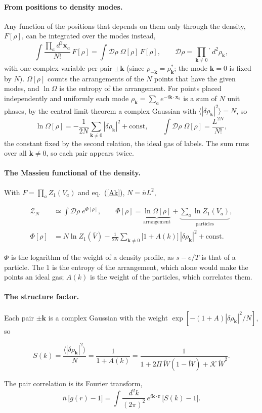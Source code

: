 \documentclass[11pt,aps,preprint,nofootinbib,superscriptaddress,tightenlines]{revtex4-2}
\newcommand{\avg}[1]{\langle #1\rangle}
\def\st{\begin{equation}}
\def\stp{\end{equation}}
\def\Eq#1{eq.~(\ref{#1})}
\let\oldparagraph\paragraph
\renewcommand{\paragraph}{\par\bigskip\oldparagraph}
\begin{document}
\paragraph{From positions to density modes.}  Any function of the positions that depends on them only through the density, $F[\rho]$, can be integrated
over the modes instead,
\st
\int\frac{\prod_ad^2\bm x_a}{N!}\,F[\rho]=\int\mathcal D\rho\;\Omega[\rho]\,F[\rho],\qquad
\mathcal D\rho=\prod_{\bm k\neq0}{}^{'}\,d^2\rho_{\bm k} ,
\stp
with one complex variable per pair $\pm\bm k$ (since $\rho_{-\bm k}=\rho_{\bm k}^*$; the mode $\bm k=0$ is fixed by $N$).  $\Omega[\rho]$ counts the
arrangements of the $N$ points that have the given modes, and $\ln\Omega$ is the entropy of the arrangement.  For points placed independently and
uniformly each mode $\rho_{\bm k}=\sum_ae^{-i\bm k\cdot\bm x_a}$ is a sum of $N$ unit phases, by the central limit theorem a complex Gaussian with
$\avg{|\delta\rho_{\bm k}|^2}=N$, so
\st
\ln\Omega[\rho]=-\frac1{2N}\sum_{\bm k\neq0}|\delta\rho_{\bm k}|^2+\text{const},\qquad
\int\mathcal D\rho\;\Omega[\rho]=\frac{L^{2N}}{N!} ,
\stp
the constant fixed by the second relation, the ideal gas of labels.  The sum runs over all $\bm k\neq0$, so each pair appears twice.

\paragraph{The Massieu functional of the density.}  With $F=\prod_aZ_1(V_a)$ and \Eq{Ak}, $N=\bar nL^2$,
\begin{keyeq}
\st
\begin{aligned}
\mathcal Z_N&\simeq\int\mathcal D\rho\;e^{\Phi[\rho]},\qquad
\Phi[\rho]=\underbrace{\ln\Omega[\rho]}_{\text{arrangement}}+\underbrace{\sum_a\ln Z_1(V_a)}_{\text{particles}},\\
\Phi[\rho]&=N\ln Z_1(\bar V)-\frac1{2N}\sum_{\bm k\neq0}\big[1+A(k)\big]\,|\delta\rho_{\bm k}|^2+\text{const}.
\end{aligned}
\label{action}
\stp
\end{keyeq}
$\Phi$ is the logarithm of the weight of a density profile, as $s-e/T$ is that of a particle.  The $1$ is the entropy of the arrangement, which alone
would make the points an ideal gas; $A(k)$ is the weight of the particles, which correlates them.

\paragraph{The structure factor.}  Each pair $\pm\bm k$ is a complex Gaussian with the weight $\exp[-(1+A)|\delta\rho_{\bm k}|^2/N]$, so
\begin{keyeq}
\st
S(k)=\frac{\avg{|\delta\rho_{\bm k}|^2}}N=\frac1{1+A(k)}=\frac{1}{1+2\Pi\,\widetilde W(1-\widetilde W)+\mathcal K\,\widetilde W^2} .
\label{Sk}
\stp
\end{keyeq}
The pair correlation is its Fourier transform,
\st
\bar n\,\big[g(r)-1\big]=\int\frac{d^2k}{(2\pi)^2}\,e^{i\bm k\cdot\bm r}\,\big[S(k)-1\big] .
\stp
\end{document}

